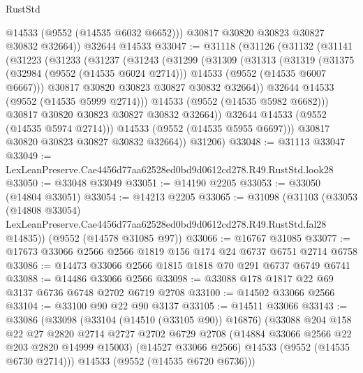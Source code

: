 \begin{lexlean}{RustStd}
\begin{coremodule}
          @14533
          (@9552 (@14535 @6032 @6652)))
        @30817
        @30820
        @30823
        @30827
        @30832
        @32664))
    @32644
    @14533
@33047 := @31118
    (@31126
      (@31132
        (@31141
          (@31223
            (@31233
              (@31237
                (@31243
                  (@31299
                    (@31309
                      (@31313
                        (@31319
                          (@31375
                            (@32984 (@9552 (@14535 @6024 @2714)))
                            @14533
                            (@9552 (@14535 @6007 @6667)))
                          @30817
                          @30820
                          @30823
                          @30827
                          @30832
                          @32664))
                      @32644
                      @14533
                      (@9552 (@14535 @5999 @2714)))
                    @14533
                    (@9552 (@14535 @5982 @6682)))
                  @30817
                  @30820
                  @30823
                  @30827
                  @30832
                  @32664))
              @32644
              @14533
              (@9552 (@14535 @5974 @2714)))
            @14533
            (@9552 (@14535 @5955 @6697)))
          @30817
          @30820
          @30823
          @30827
          @30832
          @32664))
      @31206)
@33048 := @31113 @33047
@33049 := LexLeanPreserve.Cae4456d77aa62528ed0bd9d0612cd278.R49.RustStd.look28
@33050 := @33048 @33049
@33051 := @14190 @2205
@33053 := @33050 (@14804 @33051)
@33054 := @14213 @2205
@33065 := @31098
    (@31103
      (@33053
        (@14808 @33054)
        LexLeanPreserve.Cae4456d77aa62528ed0bd9d0612cd278.R49.RustStd.fal28
        @14835))
    (@9552 (@14578 @31085 @97))
@33066 := @16767 @31085
@33077 := @17673 @33066 @2566 @2566 @1819 @156 @174 @24 @6737 @6751 @2714 @6758
@33086 := @14473 @33066 @2566 @1815 @1818 @70 @291 @6737 @6749 @6741
@33088 := @14486 @33066 @2566
@33098 := @33088 @178 @1817 @22 @69 @3137 @6736 @6748 @2702 @6719 @2708
@33100 := @14502 @33066 @2566
@33104 := @33100 @90 @22 @90 @3137
@33105 := @14511 @33066
@33143 := @33086
    (@33098
      (@33104 (@14510 (@33105 @90)) @16876)
      (@33088
        @204
        @158
        @22
        @27
        @2820
        @2714
        @2727
        @2702
        @6729
        @2708
        (@14884 @33066 @2566 @22 @203 @2820 @14999 @15003)
        (@14527 @33066 @2566)
        @14533
        (@9552 (@14535 @6730 @2714)))
      @14533
      (@9552 (@14535 @6720 @6736)))

\end{coremodule}
\end{lexlean}
